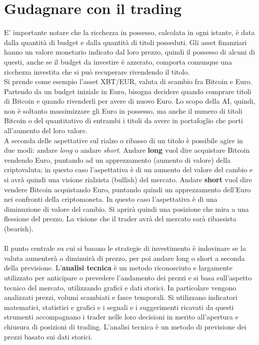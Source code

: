 \documentclass[a4paper,12pt]{report}
\begin{document}
\section{Gudagnare con il trading}
E' importante notare che la ricchezza in possesso, calcolata in ogni istante, è data dalla quantità di budget e dalla quantità di titoli posseduti. Gli asset finanziari hanno un valore monetario indicato dal loro prezzo, quindi il possesso di alcuni di questi, anche se il budget da investire è azzerato, comporta comunque una ricchezza investita che si può recuperare rivendendo il titolo.\\
Si prende come esempio l'asset XBT/EUR, valuta di scambio fra Bitcoin e Euro. Partendo da un budget iniziale in Euro, bisogna decidere quando comprare titoli di Bitcoin e quando rivenderli per avere di nuovo Euro. Lo scopo della AI, quindi, non è soltanto massimizzare gli Euro in possesso, ma anche il numero di titoli Bitcoin o del quantitativo di entrambi i titoli da avere in portafoglio che porti all'aumento del loro valore.\\
A seconda delle aspettative sul rialzo o ribasso di un titolo è possibile agire in due modi: andare \textit{long} o andare \textit{short}. Andare \textbf{long} vuol dire acquistare Bitcoin vendendo Euro, puntando ad un apprezzamento (aumento di valore) della criptovaluta; in questo caso l’aspettativa è di un aumento del valore del cambio e si avrà quindi una visione rialzista (bullish) del mercato. Andare \textbf{short} vuol dire vendere Bitcoin acquistando Euro, puntando quindi un apprezzamento dell'Euro nei confronti della criptomoneta. In questo caso l’aspettativa è di una diminuzione di valore del cambio. Si aprirà quindi una posizione che mira a una flessione del prezzo. La visione che il trader avrà del mercato sarà ribassista (bearish).\\~\\
Il punto centrale su cui si basano le strategie di investimento è indovinare se la valuta aumenterà o diminuirà di prezzo, per poi andare long o short a seconda della previsione. L'\textbf{analisi tecnica} è un metodo riconosciuto e largamente utilizzato per anticipare o prevedere l'andamento dei prezzi e si basa sull'aspetto tecnico del mercato, utilizzando grafici e dati storici. In particolare vengono analizzati prezzi, volumi scambiati e fasce temporali. Si utilizzano indicatori matematici, statistici e grafici e i segnali e i suggerimenti ricavati da questi strumenti accompagnano i trader nelle loro decisioni in merito all'apertura e chiusura di posizioni di trading. L'analisi tecnica è un metodo di previsione dei prezzi basato sui dati storici.
\end{document}
